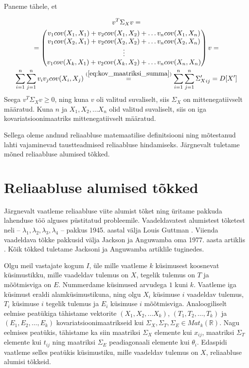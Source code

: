 \documentclass[a4paper,12pt,oneside]{article}
\numberwithin{equation}{section}
\theoremstyle{definition}
\begin{document}
Paneme tähele, et 

\begin{gather*}
v^T \Sigma_X v = \\
= \begin{pmatrix}
v_1 cov(X_1,X_1) + v_2 cov(X_1,X_2) + \hdots v_n cov(X_1,X_n) \\
v_1 cov(X_2,X_1) + v_2 cov(X_2,X_2) + \hdots v_n cov(X_2,X_n) \\
\vdots \\
v_1 cov(X_k,X_1) + v_2 cov(X_k,X_2) + \ldots v_n cov(X_n,X_n) \\
\end{pmatrix} v = \\  \sum \limits_{i=1}^n \sum \limits_{j=1}^n v_i v_j cov(X_i,X_j)  \overset{(\ref{eq:kov_maatriksi_summa})}{=} \sum \limits_{i=1}^n \sum \limits_{j=1}^n {\Sigma_X'}_{ij} = D[X']
\end{gather*}
Seega $v^T \Sigma_X v \geq 0$, ning kuna $v$ oli valitud suvaliselt, siis  $\Sigma_X$ on mittenegatiivselt määratud. Kuna $n$ ja $X_1,X_2,\ldots X_n$ olid valitud suvaliselt, siis on iga kovariatsioonimaatriks mittenegatiivselt määratud. 

Sellega oleme andnud reliaabluse matemaatilise definitsiooni ning mõtestanud lahti vajaminevad taustteadmised reliaabluse hindamiseks. Järgnevalt tuletame mõned reliaabluse alumised tõkked.   

  
\pagebreak


\section{Reliaabluse alumised tõkked}

Järgnevalt vaatleme reliaabluse viite alumist tõket  ning üritame pakkuda lahenduse töö alguses püstitatud probleemile. Vaadeldavatest alumistest tõketest neli -- $\lambda_1,\lambda_2,\lambda_3,\lambda_4$ -- pakkus  1945. aastal välja Louis Guttman \cite{Guttman1945}. Viienda vaadeldava tõkke pakkusid välja Jackson ja Anguwamba oma 1977. aasta artiklis \cite{Jackson1977}. Kõik tõkked tuletame  Jacksoni ja Anguwamba artiklile tuginedes.

Olgu meil vastajate kogum $I$, üle mille vaatleme $k$ küsimusest koosnevat küsimus\-tikku, mille vaadeldav tulemus on $X$, tegelik tulemus on $T$ ja mõõtmisviga on $E$. Nummerdame küsimused arvudega $1$ kuni $k$. Vaatleme iga küsimust eraldi alam\-küsimustikuna, ning olgu $X_i$ küsimuse $i$ vaadeldav tulemus, $T_i$ küsimuse $i$ tegelik tulemus ja $E_i$ küsimuse $i$ mõõtmisviga. Analoogiliselt eelmise peatükiga tähistame vektorite $(X_1,X_2,\ldots X_k)$, $(T_1,T_2,\ldots,T_k)$ ja $(E_1,E_2,\ldots,E_k)$ kovariatsioonimaatrikseid kui $\Sigma_X,\Sigma_T,\Sigma_E \in Mat_{k}\left(\mathbb{R}\right)$. Nagu eelmises peatükis, tähistame ka siin maatriksi $\Sigma_X$ elemente kui $x_{ij}$, maatriksi $\Sigma_T$ elemente kui $t_{ij}$ ning maatriksi $\Sigma_E$ peadiagonaali elemente kui $\theta_i$. Edaspidi vaatleme selles peatükis küsimustiku, mille vaadeldav tulemus on $X$, reliaabluse alumisi tõkkeid.
\end{document}
